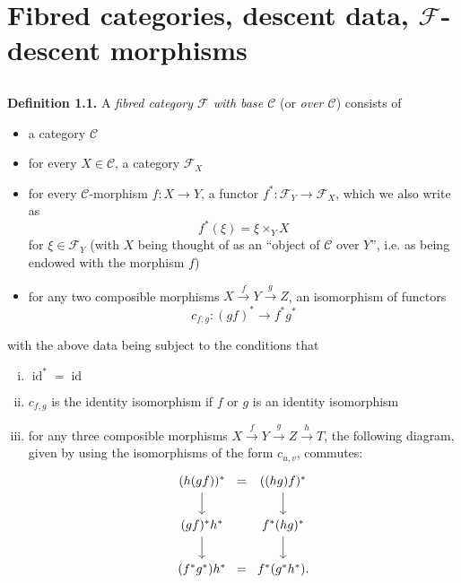 \documentclass{article}
\newenvironment{rmenv}[1]
  {\phantomsection\par\medskip\noindent\textbf{#1.}\rmfamily}
  {\medskip}
\renewcommand{\cal}[1]{{\mathcal{#1}}}
\DeclareMathOperator{\id}{id}
\begin{document}
\section{Fibred categories, descent data, \texorpdfstring{$\cal{F}$}{F}-descent morphisms}
\label{A.1}

\subsection{}
\label{A.1.a}

\begin{rmenv}{Definition 1.1}
\label{definition:A.1.1}
  A \emph{fibred category $\cal{F}$ with base $\cal{C}$} (or \emph{over $\cal{C}$}) consists of
  \begin{itemize}
    \item a category $\cal{C}$
    \item for every $X\in\cal{C}$, a category $\cal{F}_X$
    \item for every $\cal{C}$-morphism $f\colon X\to Y$, a functor $f^*\colon\cal{F}_Y\to\cal{F}_X$, which we also write as
      \[
        f^*(\xi) = \xi \times_Y X
      \]
      for $\xi\in\cal{F}_Y$ (with $X$ being thought of as an ``object of $\cal{C}$ over $Y$'', i.e. as being endowed with the morphism $f$)
    \item for any two composible morphisms $X\xrightarrow{f}Y\xrightarrow{g}Z$, an isomorphism of functors
      \[
        c_{f,g}\colon (gf)^* \to f^*g^*
      \]
  \end{itemize}
  with the above data being subject to the conditions that
  \begin{enumerate}[(i)]
    \item $\id^*=\id$
    \item $c_{f,g}$ is the identity isomorphism if $f$ or $g$ is an identity isomorphism
    \item for any three composible morphisms $X\xrightarrow{f}Y\xrightarrow{g}Z\xrightarrow{h}T$, the following diagram, given by using the isomorphisms of the form $c_{u,v}$, commutes:
      \[
        \begin{tikzcd}[column sep=0]
          (h(gf))^* \dar &=& ((hg)f)^* \dar
        \\(gf)^*h^* \dar && f^*(hg)^* \dar
        \\(f^*g^*)h^* &=& f^*(g^*h^*).
        \end{tikzcd}
      \]
  \end{enumerate}
\end{rmenv}
\end{document}
